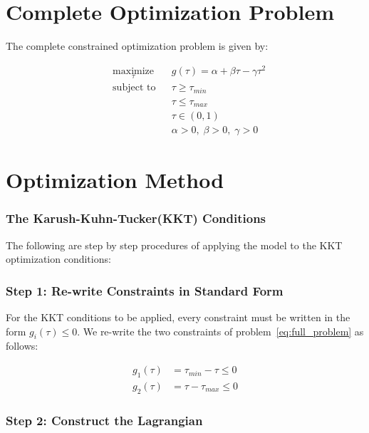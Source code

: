 \documentclass[12pt,a4paper]{report}
\theoremstyle{definition}
\theoremstyle{plain}
\theoremstyle{remark}
\begin{document}
	\section{Complete Optimization Problem}
	
	The complete constrained optimization problem is given by:
	
	\begin{equation}
		\begin{aligned}
			& \underset{\tau}{\text{maximize}} & & g(\tau) = \alpha + \beta\tau - \gamma\tau^2 \\
			& \text{subject to} & & \tau \geq \tau_{min} \\
			& & & \tau \leq \tau_{max} \\
			& & & \tau \in (0, 1) \\
			& & & \alpha > 0, \; \beta > 0, \; \gamma > 0
		\end{aligned}
		\label{eq:full_problem}
	\end{equation}
	
	\section{Optimization Method}
	\label{sec:kkt_solution}
	
	\subsubsection{The Karush-Kuhn-Tucker(KKT) Conditions}
	The following are step by step procedures of applying the model to the KKT optimization conditions:
	
	\subsubsection{Step 1: Re-write Constraints in Standard Form}
	
	For the KKT conditions to be applied, every constraint must be 
	written in the form $g_i(\tau) \leq 0$. We re-write the two 
	constraints of problem~\eqref{eq:full_problem} as follows:
	
	\begin{align}
		g_1(\tau) &= \tau_{min} - \tau \leq 0 \label{eq:g1}\\
		g_2(\tau) &= \tau - \tau_{max} \leq 0 \label{eq:g2}
	\end{align}
	
	\subsubsection{Step 2: Construct the Lagrangian}
	
\end{document}

